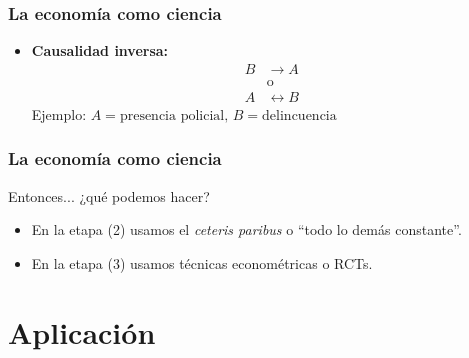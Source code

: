 \documentclass[dvipsnames,table]{beamer}
\begin{document}
		\begin{frame}
			\frametitle{La economía como ciencia}
			\begin{itemize}
				\item \textbf{Causalidad inversa:}
					\begin{align*}
						B&\to A\\
						&\text{o} \\
						A&\leftrightarrow B
					\end{align*}
				\vspace{.4cm}	
				Ejemplo: $A=\text{presencia policial, }B=\text{delincuencia}$
			\end{itemize}
		\end{frame}		

		\begin{frame}
			\frametitle{La economía como ciencia}
			Entonces... ¿qué podemos hacer?
			
			\begin{itemize}
				\item En la etapa (2) usamos el \emph{ceteris paribus} o ``todo lo demás constante''.
				\item En la etapa (3) usamos técnicas econométricas o RCTs.
			\end{itemize}
		\end{frame}		
	
	\section{Aplicación}
\end{document}
